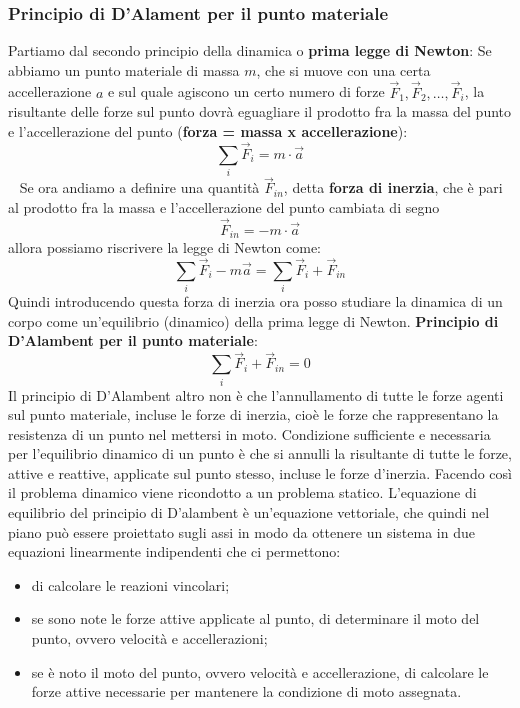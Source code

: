 \subsubsection{Principio di D'Alament per il punto materiale}
Partiamo dal secondo principio della dinamica o \textbf{prima legge di Newton}:\newline
Se abbiamo un punto materiale di massa $m$, che si muove con una certa accellerazione $a$ e sul quale agiscono un certo numero di forze $\vec{F}_1, \vec{F}_2, \dots, \vec{F}_i$, la risultante delle forze sul punto dovrà eguagliare il prodotto fra la massa del punto e l'accellerazione del punto (\textbf{forza = massa x accellerazione}):
\[
    \sum_{i} \vec{F}_{i} = m \cdot \vec{a}
\]
\ \newline
Se ora andiamo a definire una quantità $\vec{F}_{in}$, detta \textbf{forza di inerzia}, che è pari al prodotto fra la massa e l'accellerazione del punto cambiata di segno
\[
    \vec{F}_{in} = - m \cdot  \vec{a}
\]
allora possiamo riscrivere la legge di Newton come:
\[
    \sum_{i} \vec{F}_i - m \vec{a} = \sum_{i} \vec{F}_{i} + \vec{F}_{in}
\]
Quindi introducendo questa forza di inerzia ora posso studiare la dinamica di un corpo come un'equilibrio (dinamico) della prima legge di Newton.\newline
\newline
\textbf{Principio di D'Alambent per il punto materiale}:
\[
    \sum_{i} \vec{F}_{i} + \vec{F}_{in} = 0
\]
Il principio di D'Alambent altro non è che l'annullamento di tutte le forze agenti sul punto materiale, incluse le forze di inerzia, cioè le forze che rappresentano la resistenza di un punto nel mettersi in moto.\newline
\newline
Condizione sufficiente e necessaria per l'equilibrio dinamico di un punto è che si annulli la risultante di tutte le forze, attive e reattive, applicate sul punto stesso, incluse le forze d'inerzia.\newline
\newline
Facendo così il problema dinamico viene ricondotto a un problema statico.\newline
\newline
L'equazione di equilibrio del principio di D'alambent è un'equazione vettoriale, che quindi nel piano può essere proiettato sugli assi in modo da ottenere un sistema in due equazioni linearmente indipendenti che ci permettono:
\begin{itemize}
    \item di calcolare le reazioni vincolari;
    \item se sono note le forze attive applicate al punto, di determinare il moto del punto, ovvero velocità e accellerazioni;
    \item se è noto il moto del punto, ovvero velocità e accellerazione, di calcolare le forze attive necessarie per mantenere la condizione di moto assegnata.
\end{itemize}

